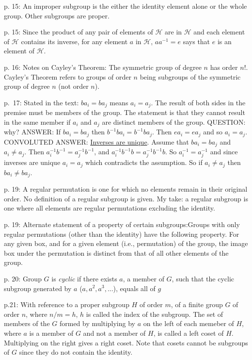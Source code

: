 p. 15: An improper subgroup is the either the identity element alone
or the whole group. Other subgroups are proper.

p. 15: Since the product of any pair of elements of $\mathcal H$ are
in $\mathcal H$ and each element of $\mathcal H$ contains its inverse,
for any element $a$ in $\mathcal H$, $aa^{-1} = e$ says that $e$ is an
element of $\mathcal H$.

p. 16: Notes on Cayley's Theorem: The symmetric group of degree $n$
has order $n!$. Cayley's Theorem refers to groups of order $n$ being
subgroups of the symmetric group of degree $n$ (not order $n$).

p.\ 17: Stated in the text: $ba_i = ba_j$ means $a_i = a_j$. The
result of both sides in the premise must be members of the group. The
statement is that they cannot result in the same member if $a_i$ and
$a_j$ are distinct members of the group. QUESTION: why? ANSWER: If
$ba_i = ba_j$ then $b^{-1}ba_i = b^{-1}ba_j$. Then $ea_i = ea_j$ and
so $a_i = a_j$. CONVOLUTED ANSWER:
\href{https://planetmath.org/uniquenessofinverseforgroups}{Inverses
  are unique}. Assume that $ba_i = ba_j$ and $a_i \neq a_j$. Then
$a^{-1}_i b^{-1} = a^{-1}_j b^{-1}$, and $a^{-1}_i b^{-1} b = a^{-1}_j
b^{-1} b$. So $a^{-1}_i = a^{-1}_j$ and since inverses are unique $a_i
= a_j$ which contradicts the assumption. So if $a_i \neq a_j$ then
$ba_i \neq ba_j$.

p. 19: A regular permutation is one for which no elements remain in
their original order. No definition of a regular subgroup is given. My
take: a regular subgroup is one where all elements are regular
permutations excluding the identity.

p. 19: Alternate statement of a property of certain
subgroups:\hfil\break Groups with only regular permutations (other
than the identity) have the following property. For any given box,
and for a given element (i.e., permutation) of the group, the image
box under the permutation is distinct from that of all other elements
of the group.

p. 20: Group $G$ is {\it cyclic} if there exists $a$, a member of $G$,
such that the cyclic subgroup generated by $a$ ($a,a^2,a^3,...$),
equals all of $g$

p.21: With reference to a proper subgroup $H$ of order $m$, of a
finite group $G$ of order $n$, where $n/m = h$, $h$ is called the
index of the subgroup. The set of members of the $G$ formed by
multiplying by $a$ on the left of each memeber of $H$, where $a$ is a
member of $G$ and not a member of $H$, is called a left coset of
$H$. Multiplying on the right gives a right coset. Note that cosets
cannot be subgroups of $G$ since they do not contain the identity.

